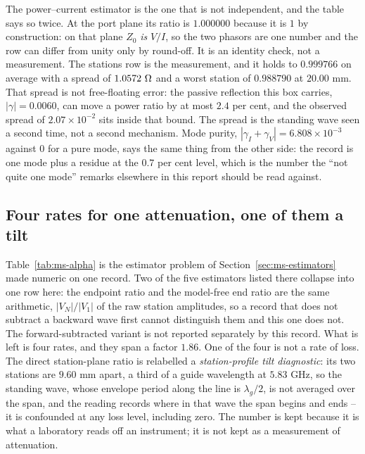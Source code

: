 The power--current estimator is the one that is not independent, and the table says so twice. At the port plane
its ratio is $1.000000$ because it is $1$ by construction: on that plane $Z_0$ \emph{is} $V/I$, so the two
phasors are one number and the row can differ from unity only by round-off. It is an identity check, not a
measurement. The stations row is the measurement, and it holds to $0.999766$ on average with a spread of
$1.0572\ \Ohm$ and a worst station of $0.988790$ at $20.00$ mm. That spread is not free-floating error: the
passive reflection this box carries, $|\gamma| = 0.0060$, can move a power ratio by at most $2.4$ per cent, and
the observed spread of $2.07\times10^{-2}$ sits inside that bound. The spread is the standing wave seen a second
time, not a second mechanism. Mode purity, $|\gamma_I + \gamma_V| = 6.808\times10^{-3}$ against $0$ for a pure
mode, says the same thing from the other side: the record is one mode plus a residue at the $0.7$ per cent level,
which is the number the ``not quite one mode'' remarks elsewhere in this report should be read against.

\subsection{Four rates for one attenuation, one of them a tilt}
\label{sec:msres-alpha}

Table~\ref{tab:ms-alpha} is the estimator problem of Section~\ref{sec:ms-estimators} made numeric on one record.
Two of the five estimators listed there collapse into one row here: the endpoint ratio and the model-free end
ratio are the same arithmetic, $|V_N|/|V_1|$ of the raw station amplitudes, so a record that does not subtract a
backward wave first cannot distinguish them and this one does not. The forward-subtracted variant is not reported
separately by this record. What is left is four rates, and they span a factor $1.86$. One of the four is not a
rate of loss. The direct station-plane ratio is relabelled a \emph{station-profile tilt diagnostic}: its two
stations are $9.60$ mm apart, a third of a guide wavelength at $5.83$ GHz, so the standing wave, whose envelope
period along
the line is $\lambda_g/2$, is not averaged over the span, and the reading records where in that wave the span
begins and ends -- it is confounded at any loss level, including zero. The number is kept because it is what a
laboratory reads off an instrument; it is not kept as a measurement of attenuation.

